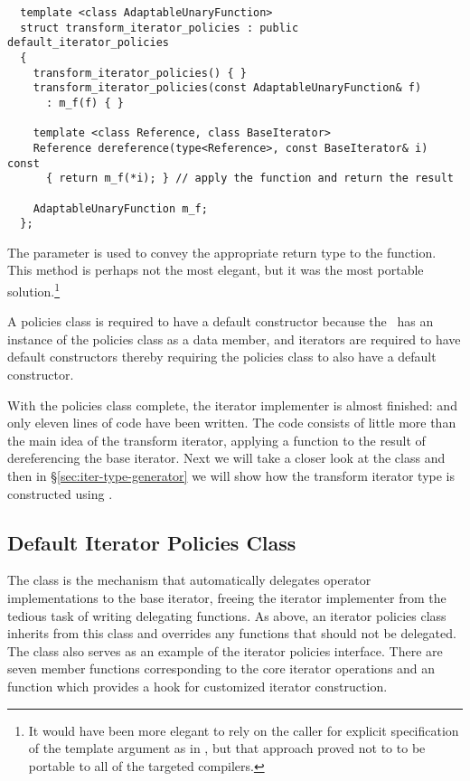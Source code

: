 \documentclass{netobjectdays}
\newcommand{\iteratoradaptor}{\code{iterator\_\-adaptor}}
\begin{document}
{\footnotesize
\begin{verbatim}
  template <class AdaptableUnaryFunction>
  struct transform_iterator_policies : public default_iterator_policies
  {
    transform_iterator_policies() { }
    transform_iterator_policies(const AdaptableUnaryFunction& f)
      : m_f(f) { }

    template <class Reference, class BaseIterator>
    Reference dereference(type<Reference>, const BaseIterator& i) const
      { return m_f(*i); } // apply the function and return the result

    AdaptableUnaryFunction m_f;
  };
\end{verbatim}
}

The  parameter is used to convey the appropriate return
type to the  function. This method is perhaps not the most
elegant, but it was the most portable solution.\footnote{It would have been more
elegant to rely on the caller for explicit specification of the 
template argument as in
, but that approach
proved not to to be portable to all of the targeted compilers.}

A policies class is required to have a default constructor because the
\iteratoradaptor\ has an instance of the policies class as a
data member, and iterators are required to have default constructors
thereby requiring the policies class to also have a default
constructor.

With the policies class complete, the iterator implementer is almost
finished: and only eleven lines of code have been written. The code
consists of little more than the main idea of the transform iterator,
applying a function to the result of dereferencing the base iterator.
Next we will take a closer look at the
 class and then in
\S\ref{sec:iter-type-generator} we will show how the transform
iterator type is constructed using \iteratoradaptor{}.


\subsection{Default Iterator Policies Class}

The  class is the mechanism that
automatically delegates operator implementations to the base iterator,
freeing the iterator implementer from the tedious task of writing
delegating functions. As above, an iterator policies class inherits
from this class and overrides any functions that should not be
delegated. The  class also
serves as an example of the iterator policies interface. There are
seven member functions corresponding to the core iterator operations
and an  function which provides a hook for
customized iterator construction.
\end{document}
